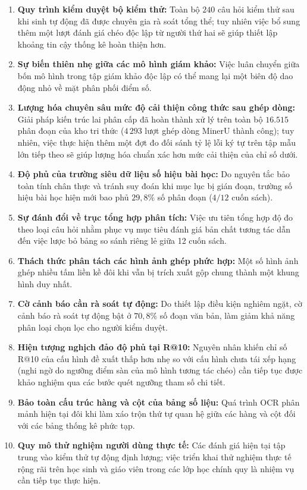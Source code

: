 \begin{enumerate}
    \item \textbf{Quy trình kiểm duyệt bộ kiểm thử:} Toàn bộ $240$ câu hỏi kiểm thử sau khi sinh tự động đã được chuyên gia rà soát tổng thể; tuy nhiên việc bổ sung thêm một lượt đánh giá chéo độc lập từ người thứ hai sẽ giúp thiết lập khoảng tin cậy thống kê hoàn thiện hơn.
    \item \textbf{Sự biến thiên nhẹ giữa các mô hình giám khảo:} Việc luân chuyển giữa bốn mô hình trong tập giám khảo độc lập có thể mang lại một biên độ dao động nhỏ về mặt phân phối điểm số.
    \item \textbf{Lượng hóa chuyên sâu mức độ cải thiện công thức sau ghép dòng:} Giải pháp kiến trúc lai phân cấp đã hoàn thành xử lý trên toàn bộ $16.515$ phân đoạn của kho tri thức ($4\,293$ lượt ghép dòng MinerU thành công); tuy nhiên, việc thực hiện thêm một đợt đo đối sánh tỷ lệ lỗi ký tự trên tập mẫu lớn tiếp theo sẽ giúp lượng hóa chuẩn xác hơn mức cải thiện của chỉ số dưới.
    \item \textbf{Độ phủ của trường siêu dữ liệu số hiệu bài học:} Do nguyên tắc bảo toàn tính chân thực và tránh suy đoán khi mục lục bị gián đoạn, trường số hiệu bài học hiện mới bao phủ $29{,}8\%$ số phân đoạn ($4/12$ cuốn sách).
    \item \textbf{Sự đánh đổi về trục tổng hợp phân tích:} Việc ưu tiên tổng hợp độ đo theo loại câu hỏi nhằm phục vụ mục tiêu đánh giá bản chất tương tác dẫn đến việc lược bỏ bảng so sánh riêng lẻ giữa 12 cuốn sách.
    \item \textbf{Thách thức phân tách các hình ảnh ghép phức hợp:} Một số hình ảnh ghép nhiều tấm liền kề đôi khi vẫn bị trích xuất gộp chung thành một khung hình duy nhất.
    \item \textbf{Cờ cảnh báo cần rà soát tự động:} Do thiết lập điều kiện nghiêm ngặt, cờ cảnh báo rà soát tự động bật ở $70{,}8\%$ số đoạn văn bản, làm giảm khả năng phân loại chọn lọc cho người kiểm duyệt.
    \item \textbf{Hiện tượng nghịch đảo độ phủ tại R@10:} Nguyên nhân khiến chỉ số R@10 của cấu hình đề xuất thấp hơn nhẹ so với cấu hình chưa tái xếp hạng (nghi ngờ do ngưỡng điểm sàn của mô hình tương tác chéo) cần tiếp tục được khảo nghiệm qua các bước quét ngưỡng tham số chi tiết.
    \item \textbf{Bảo toàn cấu trúc hàng và cột của bảng số liệu:} Quá trình OCR phân mảnh hiện tại đôi khi làm xáo trộn thứ tự quan hệ giữa các hàng và cột đối với các bảng thống kê phức tạp.
    \item \textbf{Quy mô thử nghiệm người dùng thực tế:} Các đánh giá hiện tại tập trung vào kiểm thử tự động định lượng; việc triển khai thử nghiệm thực tế rộng rãi trên học sinh và giáo viên trong các lớp học chính quy là nhiệm vụ cần tiếp tục thực hiện.
\end{enumerate}
